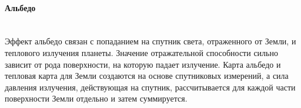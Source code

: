 \paragraph{Альбедо} \mbox{} \\

Эффект альбедо связан с попаданием на спутник света, отраженного от Земли, и теплового излучения планеты.
Значение отражательной способности сильно зависит от рода поверхности, на которую падает излучение.
Карта альбедо и тепловая карта для Земли создаются на основе спутниковых измерений, а сила давления излучения,
действующая на спутник, рассчитывается для каждой части поверхности Земли отдельно и затем суммируется.

